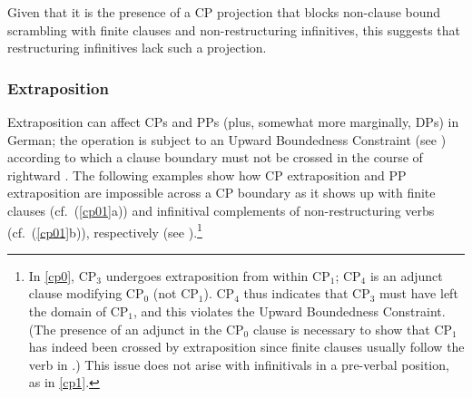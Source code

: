 \documentclass[output=paper]{langsci/langscibook}
\begin{document}
\ea\label{ex:2} 
    \z
\z

Given that it is the presence of a CP projection that blocks
non-clause bound scrambling with finite clauses and non-restructuring
infinitives, this suggests that restructuring infinitives lack such a
projection.

\subsubsection{\label{m3}Extraposition}

Extraposition can affect CPs and PPs (plus, somewhat more marginally, DPs) in
German; the operation is subject to an Upward Boundedness Constraint (see
\citealt{Ross:67}) according to which a clause boundary must not be crossed in
the course of rightward . The following examples show how CP
extraposition and PP extraposition are impossible across a CP boundary as it
shows up with finite clauses (cf.\ (\ref{cp01}a)) and infinitival complements
of non-restructuring verbs (cf.\ (\ref{cp01}b)), respectively (see
\citealt{Mueller:96:ext}).\footnote{In \eqref{cp0}, CP$_3$ undergoes
    extraposition from within CP$_1$; CP$_4$ is an adjunct clause modifying
    CP$_0$ (not CP$_1$). CP$_4$ thus indicates that CP$_3$ must have left the
    domain of CP$_1$, and this violates the Upward Boundedness Constraint. (The
    presence of an adjunct in the CP$_0$ clause is necessary to show that
    CP$_1$ has indeed been crossed by extraposition since finite clauses
usually follow the verb in .) This issue does not arise with infinitivals
in a pre-verbal position, as in \eqref{cp1}.}
\end{document}

